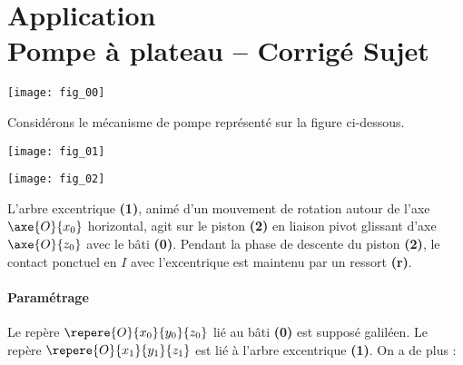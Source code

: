 \chapter*{Application  \\ 
Pompe à plateau -- \ifprof Corrigé \else Sujet \fi}


\iflivret {} \else
\ifprof  {} \else \fi
\fi
\setcounter{question}{0}



\begin{marginfigure}
\centering
\texttt{[image: fig\_00]}
\end{marginfigure}


Considérons le mécanisme de pompe représenté sur la figure ci-dessous.

\begin{marginfigure}
\centering
\texttt{[image: fig\_01]}
\end{marginfigure}

\begin{marginfigure}
\centering
\texttt{[image: fig\_02]}
\end{marginfigure}


L'arbre excentrique \textbf{(1)}, animé d'un mouvement de rotation autour de l'axe $\axe{O}{x_0}$  horizontal, agit sur le piston \textbf{(2)} en liaison pivot glissant d'axe $\axe{O}{z_0}$ avec le bâti \textbf{(0)}. Pendant la phase de descente du piston \textbf{(2)}, le contact ponctuel en $I$ avec l’excentrique est maintenu par un ressort \textbf{(r)}.

\subsubsection*{Paramétrage}
Le repère $\repere{O}{x_0}{y_0}{z_0}$ lié au bâti \textbf{(0)} est supposé galiléen.
Le repère $\repere{O}{x_1}{y_1}{z_1}$ est lié à l'arbre excentrique \textbf{(1)}.
On a de plus :

